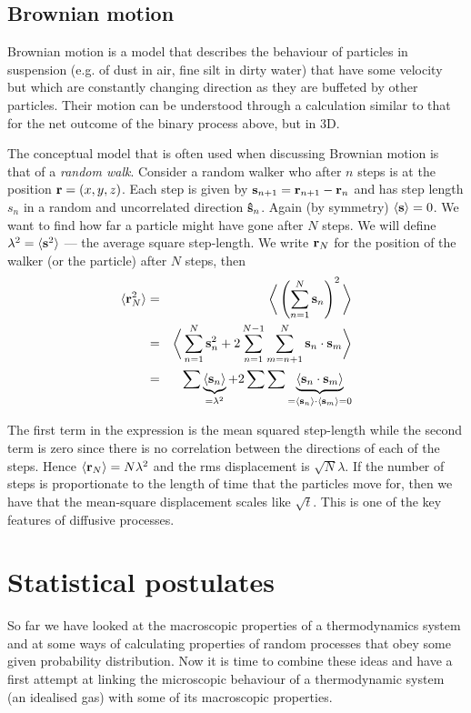 \documentclass{article}
\begin{document}
\subsection{Brownian motion}
Brownian motion is a model that describes the behaviour of particles in suspension (e.g. of dust in air, fine silt in dirty water) that have some velocity but which are constantly changing direction as they are buffeted by other particles. Their motion can be understood through a calculation similar to that for the net outcome of the binary process above, but in 3D.

The conceptual model that is often used when discussing Brownian motion is that of a \emph{random walk}. Consider a random walker who after $n$ steps is at the position ${\bf r} = (x,y,z)$. Each step is given by ${\bf s}_{n+1} = {\bf r}_{n+1}- {\bf r}_n$ and has step length $s_n$ in a random and uncorrelated direction ${\bf\hat{s}}_n$. Again (by symmetry) $\langle {\bf s}\rangle =0$. We want to find how far a particle might have gone after $N$ steps. We will define $\lambda^2= \langle {\bf s}^2\rangle$ --- the average square step-length. We write ${\bf r}_N$ for the position of the walker (or the particle) after $N$ steps, then
\begin{eqnarray*}
	\langle {\bf r}_N^2 \rangle &=& \bigg\langle \left(\sum_{n=1}^N{\bf s}_n\right)^2 \bigg\rangle\\
		&=& \bigg\langle \sum_{n=1}^N{\bf s}_n^2 +2\sum_{n=1}^{N-1}\sum_{m=n+1}^N{\bf s}_n\cdot{\bf s}_m \bigg\rangle\\
		&=& \sum\underbrace{\langle {\bf s}_n\rangle}_{=\lambda^2} + 2\sum\sum \underbrace{\langle {\bf s}_n \cdot {\bf s}_m \rangle}_{=\langle {\bf s}_n\rangle \cdot \langle{\bf s}_m \rangle=0}
\end{eqnarray*}

The first term in the expression is the mean squared step-length while the second term is zero since there is no correlation between the directions of each of the steps. Hence $\langle {\bf r}_N\rangle = N\lambda^2$ and the rms displacement is $\sqrt{N}\lambda$. If the number of steps is proportionate to the length of time that the particles move for, then we have that the mean-square displacement scales like $\sqrt{t}$. This is one of the key features of diffusive processes. 

\section{Statistical postulates}
So far we have looked at the macroscopic properties of a thermodynamics system and at some ways of calculating properties of random processes that obey some given probability distribution. Now it is time to combine these ideas and have a first attempt at linking the microscopic behaviour of a thermodynamic system (an idealised gas) with some of its macroscopic properties.
\end{document}
